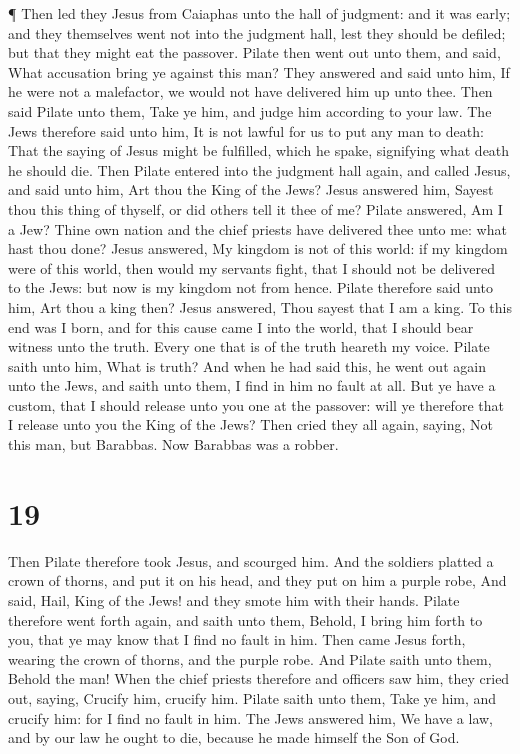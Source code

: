  ¶ Then led they Jesus from Caiaphas unto the hall of
judgment: and it was early; and they themselves went not into the
judgment hall, lest they should be defiled; but that they might eat the
passover.  Pilate then went out unto them, and said, What
accusation bring ye against this man?  They answered and
said unto him, If he were not a malefactor, we would not have delivered
him up unto thee.  Then said Pilate unto them, Take ye him,
and judge him according to your law. The Jews therefore said unto him,
It is not lawful for us to put any man to death:  That the
saying of Jesus might be fulfilled, which he spake, signifying what
death he should die.  Then Pilate entered into the judgment
hall again, and called Jesus, and said unto him, Art thou the King of
the Jews?  Jesus answered him, Sayest thou this thing of
thyself, or did others tell it thee of me?  Pilate
answered, Am I a Jew? Thine own nation and the chief priests have
delivered thee unto me: what hast thou done?  Jesus
answered, My kingdom is not of this world: if my kingdom were of this
world, then would my servants fight, that I should not be delivered to
the Jews: but now is my kingdom not from hence.  Pilate
therefore said unto him, Art thou a king then? Jesus answered, Thou
sayest that I am a king. To this end was I born, and for this cause came
I into the world, that I should bear witness unto the truth. Every one
that is of the truth heareth my voice.  Pilate saith unto
him, What is truth? And when he had said this, he went out again unto
the Jews, and saith unto them, I find in him no fault at all.
 But ye have a custom, that I should release unto you one
at the passover: will ye therefore that I release unto you the King of
the Jews?  Then cried they all again, saying, Not this man,
but Barabbas. Now Barabbas was a robber.

\hypertarget{section-18}{%
\section{19}\label{section-18}}

 Then Pilate therefore took Jesus, and scourged him.
 And the soldiers platted a crown of thorns, and put it on
his head, and they put on him a purple robe,  And said,
Hail, King of the Jews! and they smote him with their hands.
 Pilate therefore went forth again, and saith unto them,
Behold, I bring him forth to you, that ye may know that I find no fault
in him.  Then came Jesus forth, wearing the crown of thorns,
and the purple robe. And Pilate saith unto them, Behold the man!
 When the chief priests therefore and officers saw him, they
cried out, saying, Crucify him, crucify him. Pilate saith unto them,
Take ye him, and crucify him: for I find no fault in him. 
The Jews answered him, We have a law, and by our law he ought to die,
because he made himself the Son of God.

